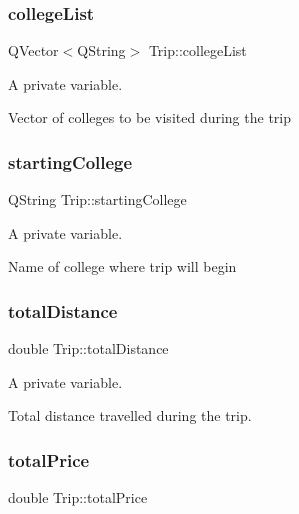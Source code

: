 \subsubsection{\texorpdfstring{college\+List}{collegeList}}
{\footnotesize\ttfamily Q\+Vector$<$Q\+String$>$ Trip\+::college\+List\hspace{0.3cm}{\ttfamily [private]}}



A private variable. 

Vector of colleges to be visited during the trip \mbox{\label{class_trip_ac31031fb291112f7d4d8a7d6249d8436}} 
\subsubsection{\texorpdfstring{starting\+College}{startingCollege}}
{\footnotesize\ttfamily Q\+String Trip\+::starting\+College\hspace{0.3cm}{\ttfamily [private]}}



A private variable. 

Name of college where trip will begin \mbox{\label{class_trip_a471bf8051193c1ffbba249171c154bda}} 
\subsubsection{\texorpdfstring{total\+Distance}{totalDistance}}
{\footnotesize\ttfamily double Trip\+::total\+Distance\hspace{0.3cm}{\ttfamily [private]}}



A private variable. 

Total distance travelled during the trip. \mbox{\label{class_trip_a33db8f1dd1ea80305ac587dcf56bf563}} 
\subsubsection{\texorpdfstring{total\+Price}{totalPrice}}
{\footnotesize\ttfamily double Trip\+::total\+Price\hspace{0.3cm}{\ttfamily [private]}}



